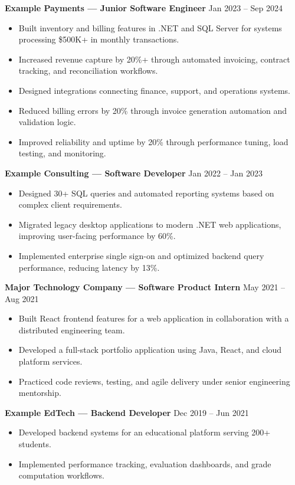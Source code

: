 \documentclass[10pt]{article}
\begin{document}
\textbf{Example Payments --- Junior Software Engineer} \hfill Jan 2023 -- Sep 2024
\begin{itemize}
    \item Built inventory and billing features in .NET and SQL Server for systems processing \$500K+ in monthly transactions.
    \item Increased revenue capture by 20\%+ through automated invoicing, contract tracking, and reconciliation workflows.
    \item Designed integrations connecting finance, support, and operations systems.
    \item Reduced billing errors by 20\% through invoice generation automation and validation logic.
    \item Improved reliability and uptime by 20\% through performance tuning, load testing, and monitoring.
\end{itemize}

\textbf{Example Consulting --- Software Developer} \hfill Jan 2022 -- Jan 2023
\begin{itemize}
    \item Designed 30+ SQL queries and automated reporting systems based on complex client requirements.
    \item Migrated legacy desktop applications to modern .NET web applications, improving user-facing performance by 60\%.
    \item Implemented enterprise single sign-on and optimized backend query performance, reducing latency by 13\%.
\end{itemize}

\textbf{Major Technology Company --- Software Product Intern} \hfill May 2021 -- Aug 2021
\begin{itemize}
    \item Built React frontend features for a web application in collaboration with a distributed engineering team.
    \item Developed a full-stack portfolio application using Java, React, and cloud platform services.
    \item Practiced code reviews, testing, and agile delivery under senior engineering mentorship.
\end{itemize}

\textbf{Example EdTech --- Backend Developer} \hfill Dec 2019 -- Jun 2021
\begin{itemize}
    \item Developed backend systems for an educational platform serving 200+ students.
    \item Implemented performance tracking, evaluation dashboards, and grade computation workflows.
\end{itemize}
\end{document}
